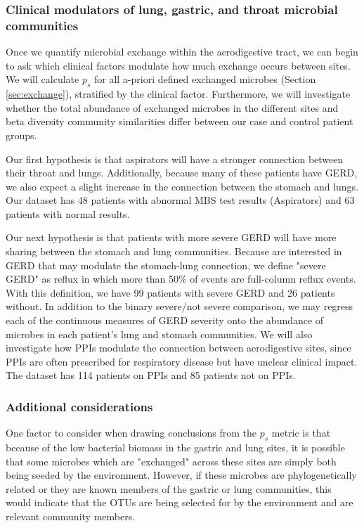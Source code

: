 \documentclass[12pt]{article}
\begin{document}
\subsubsection{Clinical modulators of lung, gastric, and throat microbial communities}
Once we quantify microbial exchange within the aerodigestive tract, we 
can begin to ask which clinical factors modulate how much exchange 
occurs between sites. We will calculate $p_s$ for all a-priori defined 
exchanged microbes (Section \ref{sec:exchange}), stratified by the 
clinical factor. Furthermore, we will investigate whether the total 
abundance of exchanged microbes in the different sites and beta 
diversity community similarities differ between our case and control 
patient groups.

Our first hypothesis is that aspirators will have a stronger 
connection between their throat and lungs. Additionally, because many 
of these patients have GERD, we also expect a slight increase in the 
connection between the stomach and lungs. Our dataset has 48 patients 
with abnormal MBS test results (Aspirators) and 63 patients with 
normal results.

Our next hypothesis is that patients with more severe GERD will have 
more sharing between the stomach and lung communities. Because are 
interested in GERD that may modulate the stomach-lung connection, we 
define "severe GERD" as reflux in which more than 50\% of events are 
full-column reflux events. With this definition, we have 99 patients 
with severe GERD and 26 patients without. In addition to the binary 
severe/not severe comparison, we may regress each of the continuous 
measures of GERD severity onto the abundance of microbes in each 
patient's lung and stomach communities. We will also investigate how 
PPIs modulate the connection between aerodigestive sites, since PPIs 
are often prescribed for respiratory disease but have unclear clinical 
impact. The dataset has 114 patients on PPIs and 85 patients not on 
PPIs.

\subsubsection{Additional considerations}
One factor to consider when drawing conclusions from the $p_s$ metric 
is that because of the low bacterial biomass in the gastric and lung 
sites, it is possible that some microbes which are "exchanged" across 
these sites are simply both being seeded by the environment. However, 
if these microbes are phylogenetically related or they are known 
members of the gastric or lung communities, this would indicate that 
the OTUs are being selected for by the environment and are relevant 
community members.
\end{document}
